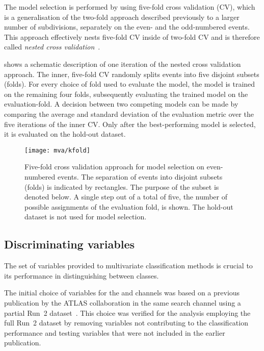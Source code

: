 The model selection is performed by using five-fold cross validation
(CV), which is a generalisation of the two-fold approach described
previously to a larger number of subdivisions, separately on the even-
and the odd-numbered events. This approach effectively nests five-fold
CV inside of two-fold CV and is therefore called \emph{nested cross
  validation}~\cite{cawley10,stone74}.

 shows a schematic description of one
iteration of the nested cross validation approach. The inner,
five-fold CV randomly splits events into five disjoint subsets
(folds). For every choice of fold used to evaluate the model, the
model is trained on the remaining four folds, subsequently evaluating
the trained model on the evaluation-fold. A decision between two
competing models can be made by comparing the average and standard
deviation of the evaluation metric over the five iterations of the
inner CV. Only after the best-performing model is
selected, it is evaluated on the
hold-out dataset.

\begin{figure}[htbp]
  \centering

  \texttt{[image: mva/kfold]}

  \caption{Five-fold cross validation approach for model selection on
    even-numbered events. The separation of events into disjoint
    subsets (folds) is indicated by rectangles. The purpose of the
    subset is denoted below. A single step out of a total of five, the
    number of possible assignments of the evaluation fold, is
    shown. The hold-out dataset is not used for model selection.}
  \label{fig:cross_validation}
\end{figure}


\subsection{Discriminating variables}
\label{sec:mva_discriminating variables}

The set of variables provided to multivariate classification methods
is crucial to its performance in distinguishing between
classes.

The initial choice of variables for the \hadhad and \lephad channels
was based on a previous publication by the ATLAS collaboration in the
same search channel using a partial Run~2
dataset~\cite{HIGG-2016-16-witherratum}. This choice was verified for
the analysis employing the full Run~2 dataset by removing variables
not contributing to the classification performance and testing
variables that were not included in the earlier publication.










